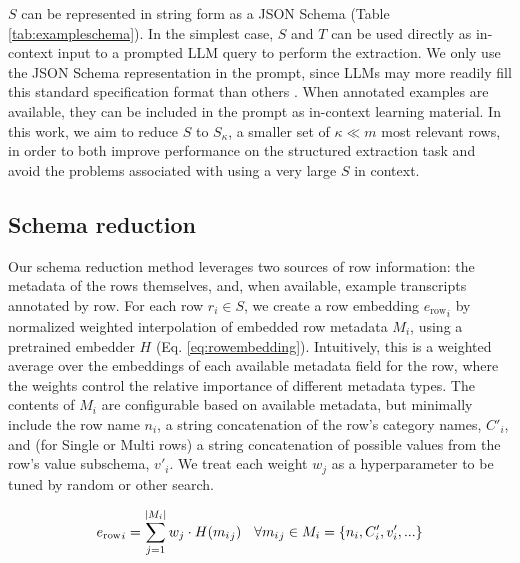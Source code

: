 \documentclass[11pt]{article}
\begin{document}
$S$ can be represented in string form as a JSON Schema (Table \ref{tab:exampleschema}). 
In the simplest case, $S$ and $T$ can be used directly as in-context input to a prompted LLM query to perform the extraction.
We only use the JSON Schema representation in the prompt,
since LLMs may more readily fill this standard specification format than others \cite{brinkmann2024}.
When annotated examples are available, they can be included in the prompt as in-context learning material. 
In this work, we aim to reduce $S$ to $S_\kappa$, a smaller set of $\kappa \ll m$ most relevant rows, 
in order to both improve performance on the structured extraction task and avoid the problems associated with using a very large $S$ in context. 



\subsection{Schema reduction}

Our schema reduction method 
leverages two sources of row information: the metadata of the rows themselves, and, when available, example transcripts annotated by row. For each row $r_i \in S$, we create a row embedding ${e_\mathrm{row}}_i$ by normalized weighted interpolation of embedded row metadata $M_i$, using a pretrained embedder $H$ (Eq. \ref{eq:rowembedding}). 
Intuitively, this is a weighted average over the embeddings of each available metadata field for the row, where the weights control the relative importance of different metadata types.
The contents of $M_i$ are configurable based on available metadata, but minimally include the row name $n_i$, a string concatenation of the row's category names, $C'_i$, and (for Single or Multi rows) a string concatenation of possible values from the row's value subschema, $v'_i$. We treat each weight $w_j$ as a hyperparameter to be tuned by random or other search.

\begin{equation}
    \small
    {e_\mathrm{row}}_i = \sum_{j=1}^{|M_i|} w_j \cdot H({{m_i}_j}) \quad \forall {{m_i}_j} \in M_i = \{n_i, C'_i, v'_i, ...\}
    \label{eq:rowembedding}
\end{equation}
\end{document}
